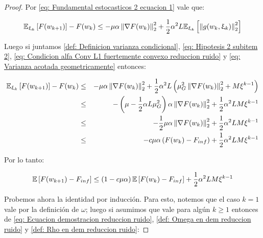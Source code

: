 \begin{proof}
	Por \ref{eq: Fundamental estocasticos 2 ecuacion 1} vale que:
	
	\begin{equation*}
		\mathbb{E}_{\upxi_{k}} \left[F(w_{k+1})\right] - F(w_k) \leq  -\mu \alpha \left\lVert\nabla F(w_k)\right\rVert_2^2 + \frac{1}{2} \alpha^2 L \mathbb{E}_{\upxi_{k}} \left[\left\lVert g(w_k, \upxi_{k})\right\rVert_2^2\right]
	\end{equation*}
	
	Luego si juntamos \ref{def: Definicion varianza condicional}, \ref{eq: Hipotesis 2 subitem 2}, \ref{eq: Condicion alfa Conv L1 fuertemente convexo reduccion ruido} y \ref{eq: Varianza acotada geometricamente} entonces:
	
	\begin{equation*}
	\begin{aligned}
		\mathbb{E}_{\upxi_{k}} \left[F(w_{k+1})\right] - F(w_k) & \leq & -\mu \alpha \left\lVert\nabla F(w_k)\right\rVert_2^2 + \frac{1}{2} \alpha^2 L \left(\mu_G^2  \left\lVert\nabla F(w_k)\right\rVert_2^2 + M \xi^{k-1}\right) \\
		& \leq & - \left(\mu - \frac{1}{2}\alpha L \mu_G^2 \right) \alpha \left\lVert\nabla F(w_k)\right\rVert_2^2 + \frac{1}{2} \alpha^2 LM \xi^{k-1} \\
		& \leq & -\frac{1}{2}\mu \alpha \left\lVert\nabla F(w_k)\right\rVert_2^2 + \frac{1}{2} \alpha^2 LM \xi^{k-1} \\
		& \leq &  -c \mu \alpha \left( F(w_k) - F_{inf} \right) + \frac{1}{2} \alpha^2 LM \xi^{k-1}
	\end{aligned}
	\end{equation*}
	
	Por lo tanto:
	
	\begin{equation}
		\label{eq: Ecuacion demostracion reduccion ruido}
		\mathbb{E} \left[F(w_{k+1}) - F_{inf}\right] \leq \left(1 - c \mu \alpha\right) \mathbb{E} \left[F(w_k) - F_{inf}\right] + \frac{1}{2} \alpha^2 LM \xi^{k-1}
	\end{equation}
	
	
	Probemos ahora la identidad por inducci\'on. Para esto, notemos que el caso $k=1$ vale por la definici\'on de $\omega$; luego si asumimos que vale para alg\'un $k \geq 1$ entonces de \ref{eq: Ecuacion demostracion reduccion ruido}, \ref{def: Omega en dem reduccion ruido} y \ref{def: Rho en dem reduccion ruido}:
	

\end{proof}
